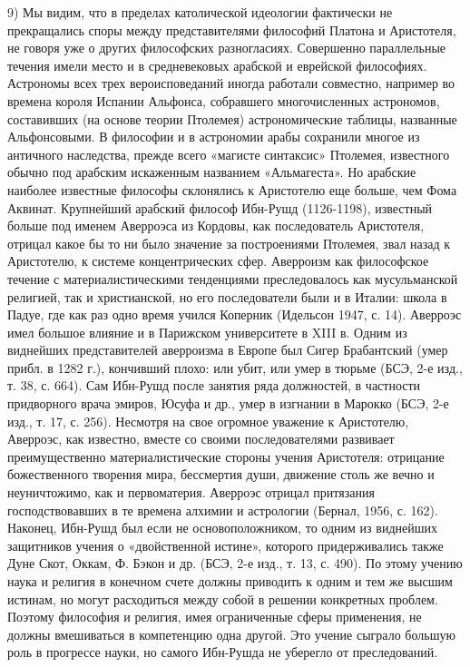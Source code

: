 9) Мы видим, что в пределах католической идеологии фактически не
прекращались споры между представителями философий Платона и
Аристотеля, не говоря уже о других философских разногласиях.
Совершенно параллельные течения имели место и в средневековых арабской
и еврейской философиях. Астрономы всех трех вероисповеданий иногда
работали совместно, например во времена короля Испании Альфонса,
собравшего многочисленных астрономов, составивших (на основе теории
Птолемея) астрономические таблицы, названные Альфонсовыми. В философии
и в астрономии арабы сохранили многое из античного наследства, прежде
всего «магисте синтаксис» Птолемея, известного обычно под арабским
искаженным названием «Альмагеста». Но арабские наиболее известные
философы склонялись к Аристотелю еще больше, чем Фома Аквинат.
Крупнейший арабский философ Ибн-Рушд (1126-1198), известный больше под
именем Аверроэса из Кордовы, как последователь Аристотеля, отрицал
какое бы то ни было значение за построениями Птолемея, звал назад к
Аристотелю, к системе концентрических сфер. Аверроизм как философское
течение с материалистическими тенденциями преследовалось как
мусульманской религией, так и христианской, но его последователи были
и в Италии: школа в Падуе, где как раз одно время учился Коперник
(Идельсон 1947, с. 14). Аверроэс имел большое влияние и в Парижском
университете в XIII в. Одним из виднейших представителей аверроизма в
Европе был Сигер Брабантский (умер прибл. в 1282 г.), кончивший плохо:
или убит, или умер в тюрьме (БСЭ, 2-е изд., т. 38, с. 664). Сам
Ибн-Рушд после занятия ряда должностей, в частности придворного врача
эмиров, Юсуфа и др., умер в изгнании в Марокко (БСЭ, 2-е изд., т. 17,
с. 256). Несмотря на свое огромное уважение к Аристотелю, Аверроэс,
как известно, вместе со своими последователями развивает
преимущественно материалистические стороны учения Аристотеля:
отрицание божественного творения мира, бессмертия души, движение столь
же вечно и неуничтожимо, как и первоматерия. Аверроэс отрицал
притязания господствовавших в те времена алхимии и астрологии (Бернал,
1956, с. 162). Наконец, Ибн-Рушд был если не основоположником, то
одним из виднейших защитников учения о «двойственной истине», которого
придерживались также Дуне Скот, Оккам, Ф. Бэкон и др. (БСЭ, 2-е изд.,
т. 13, с. 490). По этому учению наука и религия в конечном счете
должны приводить к одним и тем же высшим истинам, но могут
расходиться между собой в решении конкретных проблем. Поэтому
философия и религия, имея ограниченные сферы применения, не должны
вмешиваться в компетенцию одна другой. Это учение сыграло большую роль
в прогрессе науки, но самого Ибн-Рушда не уберегло от преследований.


